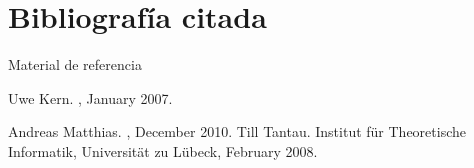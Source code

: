 \documentclass[]{beamer}
\theoremstyle{plain}
\begin{document}
\section{Bibliografía citada}
\begin{frame}{Material de referencia }

  \begin{thebibliography}{10}

    Uwe Kern.
    , January 2007.
    
    Andreas Matthias.
    , December 2010.
    Till Tantau.
    \newblock Institut f\"{u}r Theoretische Informatik, Universit\"{a}t zu
      L\"{u}beck, February 2008.
    
   

  \end{thebibliography}
  
\end{frame}
\end{document}
